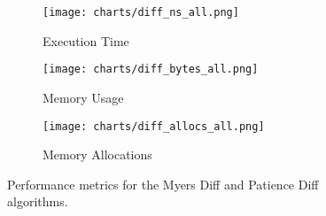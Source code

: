 \begin{figure}[h]
    \centering
    \begin{subfigure}[b]{0.75\textwidth}
        \texttt{[image: charts/diff\_ns\_all.png]}
        \caption{Execution Time}
        \label{fig:myers-diff-patience-diff-execution-time}
    \end{subfigure}

    \begin{subfigure}[b]{0.75\textwidth}
        \texttt{[image: charts/diff\_bytes\_all.png]}
        \caption{Memory Usage}
        \label{fig:myers-diff-patience-diff-memory-usage}
    \end{subfigure}

    \begin{subfigure}[b]{0.75\textwidth}
        \texttt{[image: charts/diff\_allocs\_all.png]}
        \caption{Memory Allocations}
        \label{fig:myers-diff-patience-diff-memory-allocations}
    \end{subfigure}

    \caption{Performance metrics for the Myers Diff and Patience Diff algorithms.}
    \label{fig:myers-diff-patience-diff-performance-metrics}
\end{figure}

